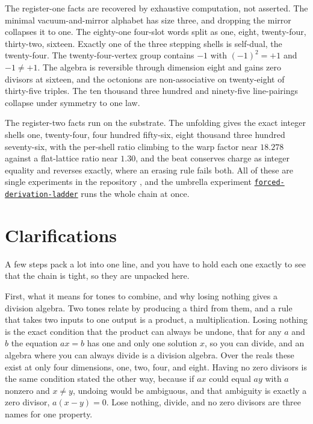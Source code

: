 \documentclass{article}
\newcommand{\code}[2]{\href{https://github.com/cluesurf/vibe/blob/make/#1}{\texttt{#2}}}
\begin{document}
The register-one facts are recovered by exhaustive computation, not asserted. The minimal
vacuum-and-mirror alphabet has size three, and dropping the mirror collapses it to one. The
eighty-one four-slot words split as one, eight, twenty-four, thirty-two, sixteen. Exactly one of
the three stepping shells is self-dual, the twenty-four. The twenty-four-vertex group contains
$-1$ with $(-1)^2 = +1$ and $-1 \neq +1$. The algebra is reversible through dimension eight and
gains zero divisors at sixteen, and the octonions are non-associative on twenty-eight of
thirty-five triples. The ten thousand three hundred and ninety-five line-pairings collapse under
symmetry to one law.

The register-two facts run on the substrate. The unfolding gives the exact
integer shells one, twenty-four, four hundred fifty-six, eight thousand three hundred seventy-six,
with the per-shell ratio climbing to the warp factor near $18.278$ against a flat-lattice ratio
near $1.30$, and the beat conserves charge as integer equality and reverses exactly, where an
erasing rule fails both. All of these are single experiments in the repository
\cite{cluesurf2026repo}, and the umbrella experiment
\code{test/experiment/foundations/forced-derivation-ladder.ts}{forced-derivation-ladder} runs the
whole chain at once.

\section{Clarifications}

A few steps pack a lot into one line, and you have to hold each one exactly to see that the
chain is tight, so they are unpacked here.

First, what it means for tones to combine, and why losing nothing gives a division algebra.
Two tones relate by producing a third from them, and a rule that takes two inputs to one output
is a product, a multiplication. Losing nothing is the exact condition that the product can
always be undone, that for any $a$ and $b$ the equation $a x = b$ has one and only one solution
$x$, so you can divide, and an algebra where you can always divide is a division algebra. Over
the reals these exist at only four dimensions, one, two, four, and eight. Having no zero
divisors is the same condition stated the other way, because if $a x$ could equal $a y$ with
$a$ nonzero and $x \neq y$, undoing would be ambiguous, and that ambiguity is exactly a zero
divisor, $a(x - y) = 0$. Lose nothing, divide, and no zero divisors are three names for one
property.
\end{document}

